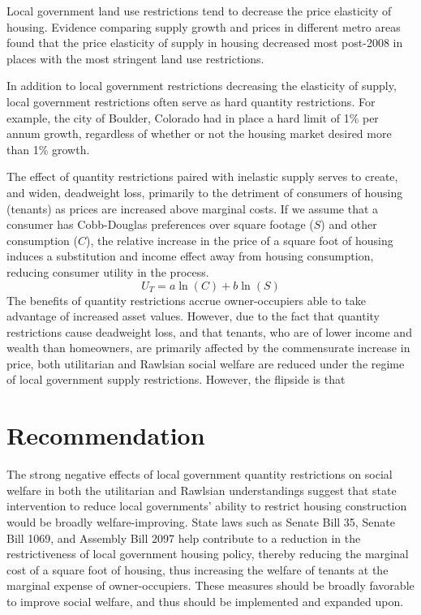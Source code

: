 \documentclass[12pt]{extarticle}
\newlength\tindent
\renewcommand{\indent}{\hspace*{\tindent}}
\begin{document}
  \indent Local government land use restrictions tend to decrease the price elasticity of housing. Evidence comparing supply growth and prices in different metro areas found that the price elasticity of supply in housing decreased most post-2008 in places with the most stringent land use restrictions.\supercite{albuquerque_2020}

  \indent In addition to local government restrictions decreasing the elasticity of supply, local government restrictions often serve as hard quantity restrictions. For example, the city of Boulder, Colorado had in place a hard limit of 1\% per annum growth,\supercite{growth_caps} regardless of whether or not the housing market desired more than 1\% growth.

  \indent The effect of quantity restrictions paired with inelastic supply serves to create, and widen, deadweight loss, primarily to the detriment of consumers of housing (tenants) as prices are increased above marginal costs. If we assume that a consumer has Cobb-Douglas preferences over square footage ($S$) and other consumption ($C$), the relative increase in the price of a square foot of housing induces a substitution and income effect away from housing consumption, reducing consumer utility in the process.
  \[U_{T} = a\ln(C) + b\ln(S)\]
  \indent The benefits of quantity restrictions accrue owner-occupiers able to take advantage of increased asset values. However, due to the fact that quantity restrictions cause deadweight loss, and that tenants, who are of lower income and wealth than homeowners,\supercite{tenant_income} are primarily affected by the commensurate increase in price, both utilitarian and Rawlsian social welfare are reduced under the regime of local government supply restrictions. However, the flipside is that 
  \section*{Recommendation}%
  \indent The strong negative effects of local government quantity restrictions on social welfare in both the utilitarian and Rawlsian understandings suggest that state intervention to reduce local governments' ability to restrict housing construction would be broadly welfare-improving. State laws such as Senate Bill 35, Senate Bill 1069, and Assembly Bill 2097 help contribute to a reduction in the restrictiveness of local government housing policy, thereby reducing the marginal cost of a square foot of housing, thus increasing the welfare of tenants at the marginal expense of owner-occupiers. These measures should be broadly favorable to improve social welfare, and thus should be implemented and expanded upon.
  \printbibliography
\end{document}
